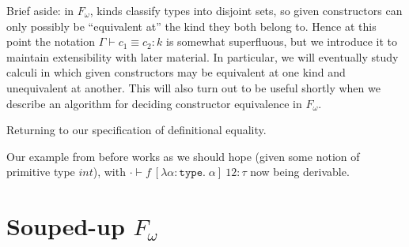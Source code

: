 \documentclass{amsart}
\newcommand{\type}{\ensuremath{\mathtt{type}}}
\begin{document}
Brief aside: in $F_\omega$, kinds classify types into disjoint sets, so given constructors can only possibly be ``equivalent at'' the kind they both belong to. Hence at this point the notation $\Gamma \vdash c_1 \equiv c_2 : k$ is somewhat superfluous, but we introduce it to maintain extensibility with later material. In particular, we will eventually study calculi in which given constructors may be equivalent at one kind and unequivalent at another. This will also turn out to be useful shortly when we describe an algorithm for deciding constructor equivalence in $F_\omega$.

Returning to our specification of definitional equality.


Our example from before works as we should hope (given some notion of primitive type $int$), with $\cdot \vdash f \ [\lambda \alpha : \type. \; \alpha] \ 12 : \tau$ now being derivable.

\section{Souped-up $F_\omega$}
\end{document}
